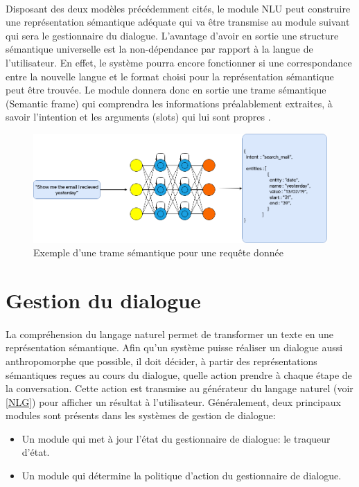 \paragraph{}
Disposant des deux modèles précédemment cités, le module NLU peut construire une représentation sémantique adéquate qui va être transmise au module suivant qui sera le gestionnaire du dialogue. L'avantage d'avoir en sortie une structure sémantique universelle est la non-dépendance par rapport à la langue de l'utilisateur. En effet, le système pourra encore fonctionner si une correspondance entre la nouvelle langue et le format choisi pour la représentation sémantique peut être trouvée. Le module donnera donc en sortie une trame sémantique (Semantic frame) qui comprendra les informations préalablement extraites, à savoir l'intention et les arguments (slots) qui lui sont propres \citep{intent_classification,intent_slots,semantic_frame}.
\begin{figure}[H]
	\centering
	\includegraphics[width=0.80\linewidth]{images/NLU/semantic_frames.png}
	\caption{Exemple d'une trame sémantique pour une requête donnée}
	\label{fig:semanticFrame}
\end{figure} 
\section{Gestion du dialogue}
\paragraph{}
La compréhension du langage naturel permet de transformer un texte en une représentation sémantique. Afin qu'un système puisse réaliser un dialogue aussi anthropomorphe que possible, il doit décider, à partir des représentations sémantiques reçues au cours du dialogue, quelle action prendre à chaque étape de la conversation. Cette action est transmise au générateur du langage naturel (voir \ref{NLG}) pour afficher un résultat à l'utilisateur. Généralement, deux principaux modules sont présents dans les systèmes de gestion de dialogue:
\begin{itemize}
	\item Un module qui met à jour l'état du gestionnaire de dialogue: le traqueur d'état.
	\item Un module qui détermine la politique d'action du gestionnaire de dialogue.
\end{itemize}

